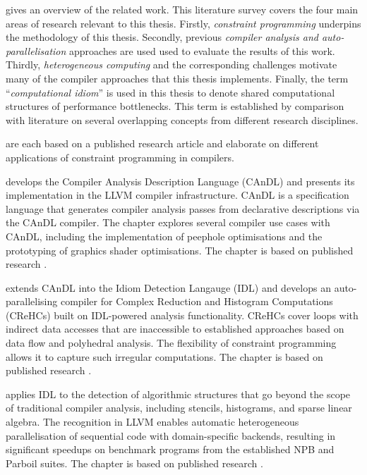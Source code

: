     {\bf{}} gives an overview of the related work.
    This literature survey covers the four main areas of research relevant to
    this thesis.
    Firstly, {\em constraint programming} underpins the methodology of this
    thesis.
    Secondly, previous {\em compiler analysis and auto-parallelisation}
    approaches are used used to evaluate the results of this work.
    Thirdly, {\em heterogeneous computing} and the corresponding challenges
    motivate many of the compiler approaches that this thesis implements.
    Finally, the term ``{\em computational idiom}'' is used in this thesis to
    denote shared computational structures of performance bottlenecks.
    This term is established by comparison with literature on several
    overlapping concepts from different research disciplines.

    {\bf{}}
    are each based on a published research article and elaborate on different
    applications of constraint programming in compilers.

    {\bf{}} develops the Compiler Analysis Description
    Language (CAnDL) and presents its implementation in the LLVM compiler
    infrastructure.
    CAnDL is a specification language that generates compiler analysis
    passes from declarative descriptions via the CAnDL compiler.
    The chapter explores several compiler use cases with CAnDL,
    including the implementation of peephole optimisations and the
    prototyping of graphics shader optimisations.
    The chapter is based on published research
    \citep{Ginsbach:2018:CDS:3178372.3179515}.

    {\bf{}} extends CAnDL into the Idiom Detection
    Langauge (IDL) and develops an auto-parallelising compiler for
    Complex Reduction and Histogram Computations (CReHCs) built on
    IDL-powered analysis functionality.
    CReHCs cover loops with indirect data accesses that are
    inaccessible to established approaches based on data flow and polyhedral
    analysis.
    The flexibility of constraint programming allows it to capture such
    irregular computations.
    The chapter is based on published research
    \citep{ginsbach2017discovery}.

    {\bf{}} applies IDL to the detection of algorithmic
    structures that go beyond the scope of traditional compiler analysis,
    including stencils, histograms, and sparse linear algebra.
    The recognition in LLVM enables automatic heterogeneous parallelisation of
    sequential code with domain-specific backends, resulting in significant
    speedups on benchmark programs from the established NPB and Parboil suites.
    The chapter is based on published research
    \citep{Ginsbach:2018:AML:3173162.3173182}.

